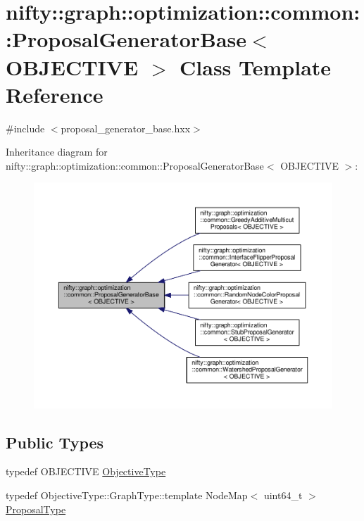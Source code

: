 \hypertarget{classnifty_1_1graph_1_1optimization_1_1common_1_1ProposalGeneratorBase}{}\section{nifty\+:\+:graph\+:\+:optimization\+:\+:common\+:\+:Proposal\+Generator\+Base$<$ O\+B\+J\+E\+C\+T\+I\+V\+E $>$ Class Template Reference}
\label{classnifty_1_1graph_1_1optimization_1_1common_1_1ProposalGeneratorBase}


{\ttfamily \#include $<$proposal\+\_\+generator\+\_\+base.\+hxx$>$}



Inheritance diagram for nifty\+:\+:graph\+:\+:optimization\+:\+:common\+:\+:Proposal\+Generator\+Base$<$ O\+B\+J\+E\+C\+T\+I\+V\+E $>$\+:\nopagebreak
\begin{figure}[H]
\begin{center}
\leavevmode
\includegraphics[width=350pt]{classnifty_1_1graph_1_1optimization_1_1common_1_1ProposalGeneratorBase__inherit__graph}
\end{center}
\end{figure}
\subsection*{Public Types}
\begin{DoxyCompactItemize}
\item 
typedef O\+B\+J\+E\+C\+T\+I\+V\+E \hyperlink{classnifty_1_1graph_1_1optimization_1_1common_1_1ProposalGeneratorBase_a26b2bcec6047d728078e1dc78d934876}{Objective\+Type}
\item 
typedef Objective\+Type\+::\+Graph\+Type\+::template Node\+Map$<$ uint64\+\_\+t $>$ \hyperlink{classnifty_1_1graph_1_1optimization_1_1common_1_1ProposalGeneratorBase_a4700eb43beb708a77c5c34612039c715}{Proposal\+Type}
\end{DoxyCompactItemize}
